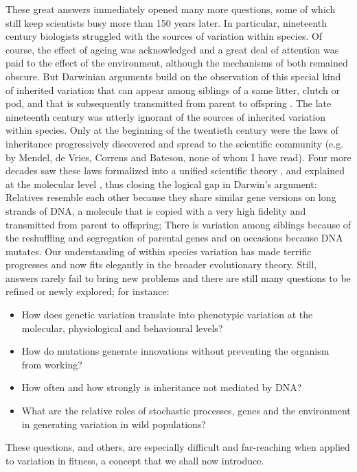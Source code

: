 These great answers immediately opened many more questions, some of which still keep scientists busy more than 150 years later. In particular, nineteenth century biologists struggled with the sources of variation within species. Of course, the effect of ageing was acknowledged and a great deal of attention was paid to the effect of the environment, although the mechanisms of both remained obscure. 
But Darwinian arguments build on the observation of this special kind of inherited variation that can appear among siblings of a same litter, clutch or pod, and that is subsequently transmitted from parent to offspring \parencite[][Chapter 1]{Darwin1859}. The late nineteenth century was utterly ignorant of the sources of inherited variation within species. Only at the beginning of the twentieth century were the laws of inheritance progressively discovered and spread to the scientific community (e.g. by Mendel, de Vries, Correns and Bateson, none of whom I have read). Four more decades saw these laws formalized into a unified scientific theory \parencite{Fisher1930}, and explained at the molecular level \parencite{Oswald1943, Watson1953}, thus closing the logical gap in Darwin's argument: Relatives resemble each other because they share similar gene versions on long strands of DNA, a molecule that is copied with a very high fidelity and transmitted from parent to offspring; There is variation among siblings because of the reshuffling and segregation of parental genes and  on occasions because DNA mutates. 
Our understanding of within species variation has made terrific progresses and now fits elegantly in the broader evolutionary theory. Still, answers rarely fail to bring new problems and there are still many questions to be refined or newly explored; for instance:
\begin{itemize}
\item How does genetic variation translate into phenotypic variation at the molecular, physiological and behavioural levels? \parencite{Kirschner2010}
\item How do mutations generate innovations without preventing the organism from working? \parencite{Wagner2014} 
\item How often and how strongly is inheritance not mediated by DNA? \parencite{Bonduriansky2012}
\item What are the relative roles of stochastic processes, genes and the environment in generating variation in wild populations? \parencite{Raj2008, Postma2014}
\end{itemize}
These questions, and others, are especially difficult and far-reaching when applied to variation in fitness, a concept that we shall now introduce. 

